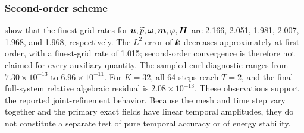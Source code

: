 \subsubsection{Second-order scheme}
\label{subsec:numerical-second-order}
 show that
the finest-grid rates for $\boldsymbol u,\widetilde p,\boldsymbol\omega,\boldsymbol m,
\varphi,\boldsymbol H$ are 2.166, 2.051, 1.981, 2.007, 1.968, and 1.968,
respectively. The $L^2$ error of $\boldsymbol k$ decreases approximately at
first order, with a finest-grid rate of 1.015; second-order convergence
is therefore not claimed for every auxiliary quantity.
The sampled curl diagnostic ranges from $7.30\times10^{-13}$ to
$6.96\times10^{-11}$. For $K=32$, all 64 steps reach $T=2$, and
the final full-system relative algebraic residual is
$2.08\times10^{-13}$.
These observations support the reported joint-refinement behavior.
Because the mesh and time step vary together and the primary exact
fields have linear temporal amplitudes, they do not constitute a
separate test of pure temporal accuracy or of energy stability.

